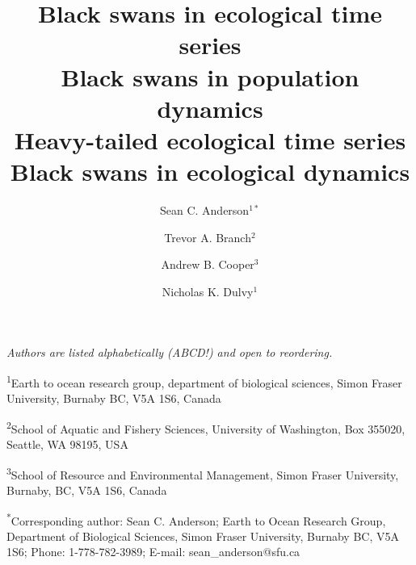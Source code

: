 \documentclass[12pt]{article}
\title{Black swans in ecological time series\\Black swans in population dynamics\\Heavy-tailed ecological time series\\Black swans in ecological dynamics}
\author{
Sean C. Anderson$^{1\ast}$ \and
Trevor A. Branch$^2$ \and
Andrew B. Cooper$^3$ \and
Nicholas K. Dulvy$^1$
}
\date{}
\begin{document}
\maketitle
\doublespacing
\onehalfspacing


\noindent
\emph{Authors are listed alphabetically (ABCD!) and open to reordering.}

\noindent
\textsuperscript{1}Earth to ocean research group, department of biological sciences, Simon Fraser University, Burnaby BC, V5A 1S6, Canada

\noindent
\textsuperscript{2}School of Aquatic and Fishery Sciences, University of Washington, Box 355020, Seattle, WA 98195, USA

\noindent
\textsuperscript{3}School of Resource and Environmental Management, Simon Fraser University, Burnaby, BC, V5A 1S6, Canada

\noindent
\textsuperscript{*}Corresponding author: Sean C. Anderson; Earth to Ocean Research Group, Department of Biological Sciences, Simon Fraser University, Burnaby BC, V5A 1S6; Phone: 1-778-782-3989; E-mail: sean\_anderson@sfu.ca



\thispagestyle{empty}

\linenumbers





\renewcommand{\thetable}{S\arabic{table}}
\setcounter{table}{0}




\end{document}
